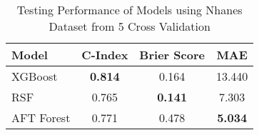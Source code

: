 \begin{table}[h!]
\centering
\caption{Testing Performance of Models using Nhanes Dataset from 5 Cross Validation}
\label{tab:test_performance_nhanes}
\begin{tabular}{l|c|c|c}
\hline
\textbf{Model} & \textbf{C-Index} & \textbf{Brier Score} & \textbf{MAE} \\
\hline
XGBoost & \textbf{0.814} & 0.164 & 13.440 \\
RSF & 0.765 & \textbf{0.141} & 7.303 \\
AFT Forest & 0.771 & 0.478 & \textbf{5.034} \\
\hline
\end{tabular}
\end{table}

